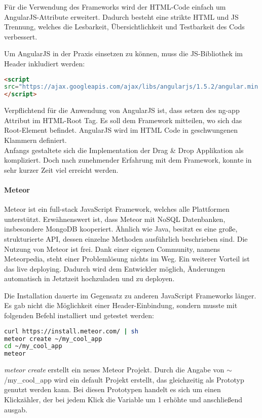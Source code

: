 Für die Verwendung des Frameworks wird der HTML-Code einfach um AngularJS-Attribute erweitert. Dadurch besteht eine strikte HTML und JS Trennung, welches die Lesbarkeit, Übersichtlichkeit und Testbarkeit des Cods verbessert. \cite{ANGULARJS}

Um AngularJS in der Praxis einsetzen zu können, muss die JS-Bibliothek im Header inkludiert werden: 
\begin{lstlisting}[caption={AngularJS einbinden\cite{ANGULARJSDOWN}}, language=HTML]
<script 
src="https://ajax.googleapis.com/ajax/libs/angularjs/1.5.2/angular.min.js">
</script>
\end{lstlisting}

Verpflichtend für die Anwendung von AngularJS ist, dass setzen des ng-app Attribut im HTML-Root Tag. Es soll dem Framework mitteilen, wo sich das Root-Element befindet. AngularJS wird im HTML Code in geschwungenen Klammern definiert.\\
Anfangs gestaltete sich die Implementation der Drag \& Drop Applikation als kompliziert. Doch nach zunehmender Erfahrung mit dem Framework, konnte in sehr kurzer Zeit viel erreicht werden.

\paragraph{Meteor}
Meteor ist ein full-stack JavaScript Framework, welches alle Plattformen unterstützt. Erwähnenswert ist, dass Meteor mit NoSQL Datenbanken, insbesondere MongoDB kooperiert. Ähnlich wie Java, besitzt es eine große, strukturierte API, dessen einzelne Methoden ausführlich beschrieben sind. Die Nutzung von Meteor ist frei. Dank einer eigenen Community, namens Meteorpedia, steht einer Problemlösung nichts im Weg. Ein weiterer Vorteil ist das live deploying. Dadurch wird dem Entwickler möglich, Änderungen automatisch in Jetztzeit hochzuladen und zu deployen. \cite{METEOR}

\newpage

Die Installation dauerte im Gegensatz zu anderen JavaScript Frameworks länger. Es gab nicht die Möglichkeit einer Header-Einbindung, sondern musste mit folgenden Befehl installiert und getestet werden:
\begin{lstlisting}[caption={Installation von Meteor \cite{METEORINSTALL}}, language=bash]
curl https://install.meteor.com/ | sh
meteor create ~/my_cool_app
cd ~/my_cool_app
meteor
\end{lstlisting}

\textit{meteor create} erstellt ein neues Meteor Projekt. Durch die Angabe von $\sim$/my\_cool\_app wird ein default Projekt erstellt, das gleichzeitig als Prototyp genutzt werden kann. Bei diesen Prototypen handelt es sich um einen Klickzähler, der bei jedem Klick die Variable um 1 erhöhte und anschließend ausgab.

